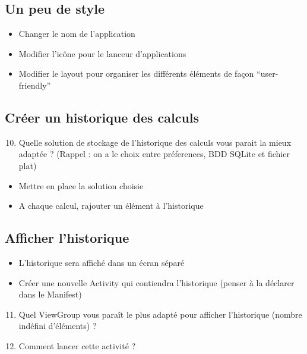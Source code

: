 \documentclass{article}
\begin{document}
\subsection{Un peu de style}
\begin{itemize}
\item Changer le nom de l'application
\item Modifier l'icône pour le lanceur d'applications
\item Modifier le layout pour organiser les différents éléments de façon ``user-friendly''
\end{itemize}
\subsection{Créer un historique des calculs}
\begin{enumerate}
 \setcounter{enumi}{9}
\item Quelle solution de stockage de l'historique des calculs vous parait la mieux adaptée ? (Rappel : on a le choix entre préferences, BDD SQLite et fichier plat) 
\end{enumerate}
\begin{itemize}
\item Mettre en place la solution choisie
\item A chaque calcul, rajouter un élément à l'historique
\end{itemize}
\subsection{Afficher l'historique}
\begin{itemize}
\item L'historique sera affiché dans un écran séparé
\item Créer une nouvelle Activity qui contiendra l'historique (penser à la déclarer dans le Manifest)
\end{itemize}
\begin{enumerate}
 \setcounter{enumi}{10}
\item Quel ViewGroup vous paraît le plus adapté pour afficher l'historique (nombre indéfini d'éléments) ?
\item Comment lancer cette activité ?
\end{enumerate}
\end{document}
